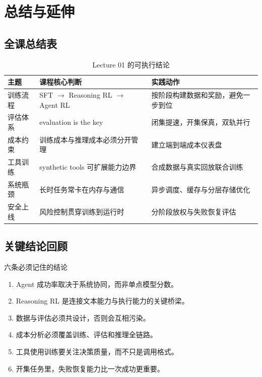 \section{总结与延伸}

\subsection{全课总结表}
\begin{table}[H]
\centering
\begin{tabular}{p{2.9cm}p{4.3cm}p{4.5cm}}
\toprule
\textbf{主题} & \textbf{课程核心判断} & \textbf{实践动作} \\
\midrule
训练流程 & SFT $\rightarrow$ Reasoning RL $\rightarrow$ Agent RL & 按阶段构建数据和奖励，避免一步到位 \\
评估体系 & evaluation is the key & 闭集提速，开集保真，双轨并行 \\
成本约束 & 训练成本与推理成本必须分开管理 & 建立端到端成本仪表盘 \\
工具训练 & synthetic tools 可扩展能力边界 & 合成数据与真实回放联合训练 \\
系统瓶颈 & 长时任务常卡在内存与通信 & 异步调度、缓存与分层存储优化 \\
安全上线 & 风险控制贯穿训练到运行时 & 分阶段放权与失败恢复评估 \\
\bottomrule
\end{tabular}
\caption{Lecture 01 的可执行结论}
\end{table}

\subsection{关键结论回顾}
\begin{importantbox}{六条必须记住的结论}
\begin{enumerate}
    \item Agent 成功率取决于系统协同，而非单点模型分数。
    \item Reasoning RL 是连接文本能力与执行能力的关键桥梁。
    \item 数据与评估必须共设计，否则会互相污染。
    \item 成本分析必须覆盖训练、评估和推理全链路。
    \item 工具使用训练要关注决策质量，而不只是调用格式。
    \item 开集任务里，失败恢复能力比一次成功更重要。
\end{enumerate}
\end{importantbox}

